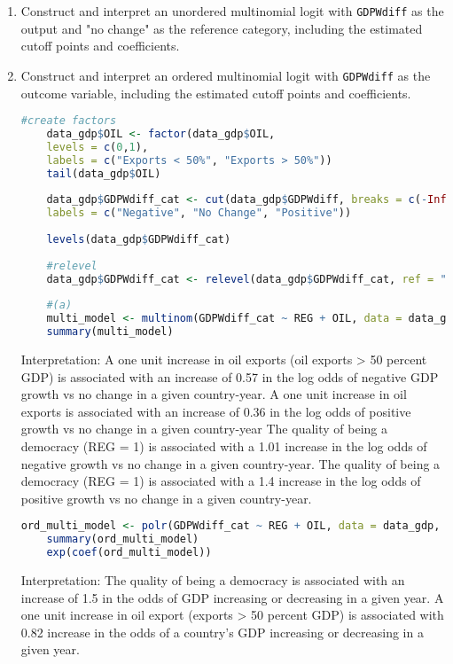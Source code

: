 \documentclass[12pt,letterpaper]{article}
\begin{document}
\begin{enumerate}
	\item Construct and interpret an unordered multinomial logit with \texttt{GDPWdiff} as the output and "no change" as the reference category, including the estimated cutoff points and coefficients.
	\item Construct and interpret an ordered multinomial logit with \texttt{GDPWdiff} as the outcome variable, including the estimated cutoff points and coefficients.
	

	\begin{lstlisting}[language=R] 
	#create factors
	data_gdp$OIL <- factor(data_gdp$OIL,
	levels = c(0,1),
	labels = c("Exports < 50%", "Exports > 50%"))
	tail(data_gdp$OIL)
	
	data_gdp$GDPWdiff_cat <- cut(data_gdp$GDPWdiff, breaks = c(-Inf, -1, 1,Inf),
	labels = c("Negative", "No Change", "Positive"))
	
	levels(data_gdp$GDPWdiff_cat)
	
	#relevel
	data_gdp$GDPWdiff_cat <- relevel(data_gdp$GDPWdiff_cat, ref = "No Change")
	
	#(a)
	multi_model <- multinom(GDPWdiff_cat ~ REG + OIL, data = data_gdp)
	summary(multi_model) \end{lstlisting}
	
	Interpretation:
	A one unit increase in oil exports (oil exports > 50 percent GDP) is associated with 
	an increase of 0.57 in the log odds of negative GDP growth vs no change in a 
	given country-year. A one unit increase in oil exports is associated with an increase 
	of 0.36 in the log odds of positive growth vs no change in a given country-year
	The quality of being a democracy (REG = 1) is associated with a 1.01 increase 
	in the log odds of negative growth vs no change in a given country-year.
	The quality of being a democracy (REG = 1) is associated with a 1.4 increase in 
	the log odds of positive growth vs no change in a given country-year.
	\begin{lstlisting}[language=R] 
	ord_multi_model <- polr(GDPWdiff_cat ~ REG + OIL, data = data_gdp, Hess = TRUE) 
	summary(ord_multi_model)
	exp(coef(ord_multi_model))\end{lstlisting}
	Interpretation: The quality of being a democracy is associated with an increase of 1.5 in the 
	odds of GDP increasing or decreasing in a given year.
	A one unit increase in oil export (exports > 50 percent GDP) is associated with 0.82 increase
	in the odds of a country's GDP increasing or decreasing in a given year.
	
\end{enumerate}
\end{document}
